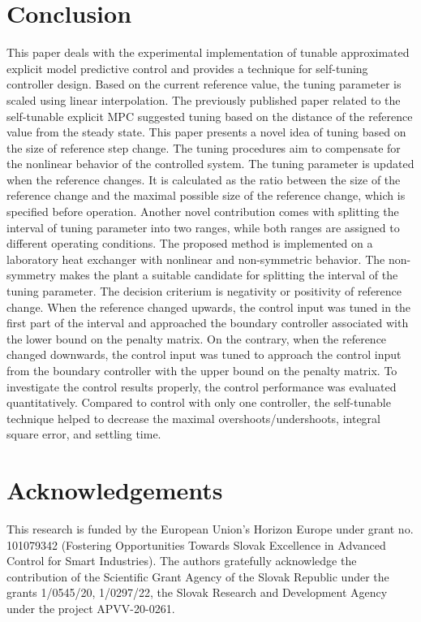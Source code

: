 \documentclass[preprint,12pt]{elsarticle}
\begin{document}
\section{Conclusion}
\label{sec:conclusion}
This paper deals with the experimental implementation of tunable approximated explicit model predictive control and provides a technique for self-tuning controller design. Based on the current reference value, the tuning parameter is scaled using linear interpolation. The previously published paper related to the self-tunable explicit MPC suggested tuning based on the distance of the reference value from the steady state. This paper presents a novel idea of tuning based on the size of reference step change. The tuning procedures aim to compensate for the nonlinear behavior of the controlled system. The tuning parameter is updated when the reference changes. It is calculated as the ratio between the size of the reference change and the maximal possible size of the reference change, which is specified before operation. Another novel contribution comes with splitting the interval of tuning parameter into two ranges, while both ranges are assigned to different operating conditions. The proposed method is implemented on a laboratory heat exchanger with nonlinear and non-symmetric behavior. The non-symmetry makes the plant a suitable candidate for splitting the interval of the tuning parameter. The decision criterium is negativity or positivity of reference change. When the reference changed upwards, the control input was tuned in the first part of the interval and approached the boundary controller associated with the lower bound on the penalty matrix. On the contrary, when the reference changed downwards, the control input was tuned to approach the control input from the boundary controller with the upper bound on the penalty matrix. To investigate the control results properly, the control performance was evaluated quantitatively. Compared to control with only one controller, the self-tunable technique helped to decrease the maximal overshoots/undershoots, integral square error, and settling time.

\section*{Acknowledgements}
This research is funded by the European Union’s Horizon Europe under grant no. 101079342 (Fostering Opportunities Towards Slovak Excellence in Advanced Control for Smart Industries). The authors gratefully acknowledge the contribution of the Scientific Grant Agency of the Slovak Republic under the grants 1/0545/20, 1/0297/22, the Slovak Research and Development Agency under the project APVV-20-0261. 
\end{document}
